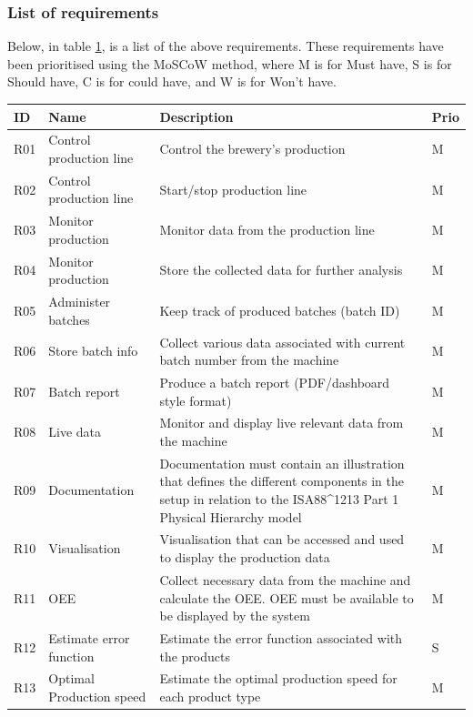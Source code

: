 \subsubsection{List of requirements}
Below, in table \ref{table:Requirements}, is a list of the above requirements. These requirements have been
prioritised using the MoSCoW method, where M is for Must have, S is for
Should have, C is for could have, and W is for Won't have. 

\begin{table}[H]
    \begin{tabularx}{\textwidth}{|>{\RaggedRight}p{1cm}|>{\RaggedRight}p{4cm}|>{\RaggedRight}X|>{\RaggedRight}p{1cm}|}
        \hline
        \textbf{ID} & \textbf{Name} & \textbf{Description} & \textbf{Prio} \\
        \hline
        R01 & Control production line & Control the brewery's production & M \\
        \hline
        R02 & Control production line & Start/stop production line & M \\
        \hline
        R03 & Monitor production & Monitor data from the production line & M \\
        \hline
        R04 & Monitor production & Store the collected data for further analysis & M \\
        \hline
        R05 & Administer batches & Keep track of produced batches (batch ID) & M \\
        \hline
        R06 & Store batch info & Collect various data associated with current batch number from the machine & M \\
        \hline
        R07 & Batch report & Produce a batch report (PDF/dashboard style format) & M \\
        \hline
        R08 & Live data & Monitor and display live relevant data from the machine & M \\
        \hline
        R09 & Documentation & Documentation must contain an illustration that defines the different components in the setup in relation to the ISA88\^{}1213 Part 1 Physical Hierarchy model & M \\
        \hline
        R10 & Visualisation & Visualisation that can be accessed and used to display the production data & M \\
        \hline
        R11 & OEE & Collect necessary data from the machine and calculate the OEE. OEE must be available to be displayed by the system & M \\
        \hline
        R12 & Estimate error function & Estimate the error function associated with the products & S \\
        \hline
        R13 & Optimal Production speed & Estimate the optimal production speed for each product type & M \\
        \hline
    \end{tabularx}
    \label{table:Requirements}
\end{table}

